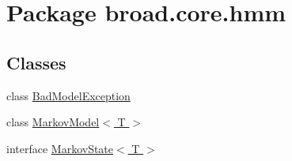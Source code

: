 \hypertarget{namespacebroad_1_1core_1_1hmm}{\section{Package broad.\+core.\+hmm}
\label{namespacebroad_1_1core_1_1hmm}
}
\subsection*{Classes}
\begin{DoxyCompactItemize}
\item 
class \hyperlink{classbroad_1_1core_1_1hmm_1_1_bad_model_exception}{Bad\+Model\+Exception}
\item 
class \hyperlink{classbroad_1_1core_1_1hmm_1_1_markov_model_3_01_t_01_4}{Markov\+Model$<$ T $>$}
\item 
interface \hyperlink{interfacebroad_1_1core_1_1hmm_1_1_markov_state_3_01_t_01_4}{Markov\+State$<$ T $>$}
\end{DoxyCompactItemize}
